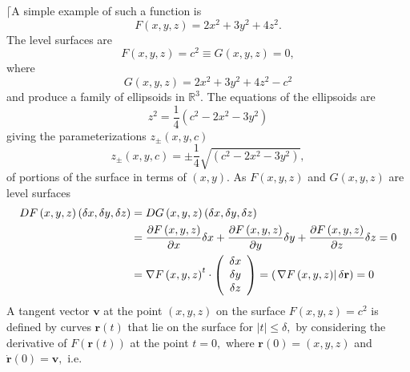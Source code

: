 \documentclass[aps,preprint]{revtex4}%
\begin{document}
$\lceil$A simple example of such a function is
\begin{equation}
F\left(  x,y,z\right)  =2x^{2}+3y^{2}+4z^{2}.
\end{equation}
The level surfaces are
\begin{equation}
F\left(  x,y,z\right)  =c^{2}\equiv G\left(  x,y,z\right)  =0,
\end{equation}
where
\begin{equation}
G\left(  x,y,z\right)  =2x^{2}+3y^{2}+4z^{2}-c^{2}%
\end{equation}
and produce a family of ellipsoids in $\mathbb{R}^{3}.$ The equations of the
ellipsoids are
\begin{equation}
z^{2}=\frac{1}{4}\left(  c^{2}-2x^{2}-3y^{2}\right)
\end{equation}
giving the parameterizations $z_{\pm}\left(  x,y,c\right)  $
\begin{equation}
z_{\pm}\left(  x,y,c\right)  =\pm\frac{1}{4}\sqrt{\left(  c^{2}-2x^{2}%
-3y^{2}\right)  },
\end{equation}
of portions of the surface in terms of $\left(  x,y\right)  $. As $F\left(
x,y,z\right)  $ and $G\left(  x,y,z\right)  $ are level surfaces
\begin{align}
DF\left(  x,y,z\right)  \left(  \delta x,\delta y,\delta z\right)   &
=DG\left(  x,y,z\right)  \left(  \delta x,\delta y,\delta z\right) \nonumber\\
&  =\frac{\partial F\left(  x,y,z\right)  }{\partial x}\delta x+\frac{\partial
F\left(  x,y,z\right)  }{\partial y}\delta y+\frac{\partial F\left(
x,y,z\right)  }{\partial z}\delta z=0\nonumber\\
&  =\nabla F\left(  x,y,z\right)  ^{t}\cdot\left(
\begin{array}
[c]{c}%
\delta x\\
\delta y\\
\delta z
\end{array}
\right)  =\left(  \left.  \nabla F\left(  x,y,z\right)  \right\vert
\delta\mathbf{r}\right)  =0
\end{align}
A tangent vector $\mathbf{v}$ at the point $\left(  x,y,z\right)  $ on the
surface $F\left(  x,y,z\right)  =c^{2}$ is defined by curves $\mathbf{r}%
\left(  t\right)  $ that lie on the surface for $\left\vert t\right\vert
\leq\delta,$ by considering the derivative of $F\left(  \mathbf{r}\left(
t\right)  \right)  $ at the point $t=0,$ where $\mathbf{r}\left(  0\right)
=\left(  x,y,z\right)  $ and $\mathbf{\dot{r}}\left(  0\right)  =\mathbf{v,}$
i.e.
\end{document}
